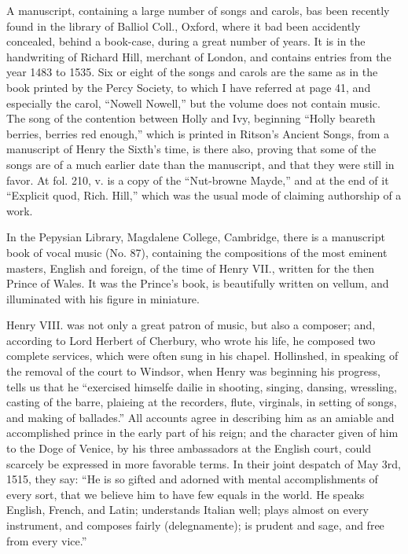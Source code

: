 A manuscript, containing a large number of songs and carols, bas been recently
found in the library of Balliol Coll., Oxford, where it bad been accidently concealed,
behind a book-case, during a great number of years. It is in the handwriting
of Richard Hill, merchant of London, and contains entries from the year
1483 to 1535. Six or eight of the songs and carols are the same as in the book
printed by the Percy Society, to which I have referred at page 41, and especially
the carol, “Nowell Nowell,” but the volume does not contain music. The song
of the contention between Holly and Ivy, beginning “Holly beareth berries, berries
red enough,” which is printed in Ritson’s Ancient Songs, from a manuscript
of Henry the Sixth’s time, is there also, proving that some of the songs are
of a much earlier date than the manuscript, and that they were still in favor. At
fol. 210, v. is a copy of the “Nut-browne Mayde,” and at the end of it “Explicit
quod, Rich. Hill,” which was the usual mode of claiming authorship of a work.

In the Pepysian Library, Magdalene College, Cambridge, there is a manuscript
book of vocal music (No. 87), containing the compositions of the most eminent
masters, English and foreign, of the time of Henry VII., written for the then
Prince of Wales. It was the Prince’s book, is beautifully written on vellum, and
illuminated with his figure in miniature.

Henry VIII. was not only a great patron of music, but also a composer; and,
according to Lord Herbert of Cherbury, who wrote his life, he composed two
complete services, which were often sung in his chapel. Hollinshed, in speaking
of the removal of the court to Windsor, when Henry was beginning his progress,
tells us that he “exercised himselfe dailie in shooting, singing, dansing, wressling,
casting of the barre, plaieing at the recorders, flute, virginals, in setting of songs,
and making of ballades.” All accounts agree in describing him as an amiable and
accomplished prince in the early part of his reign; and the character given of him
to the Doge of Venice, by his three ambassadors at the English court, could
scarcely be expressed in more favorable terms. In their joint despatch of
May 3rd, 1515, they say: “He is so gifted and adorned with mental accomplishments
of every sort, that we believe him to have few equals in the world. He
speaks English, French, and Latin; understands Italian well; plays almost
on every instrument, and composes fairly (delegnamente); is prudent and sage,
and free from every vice.”

